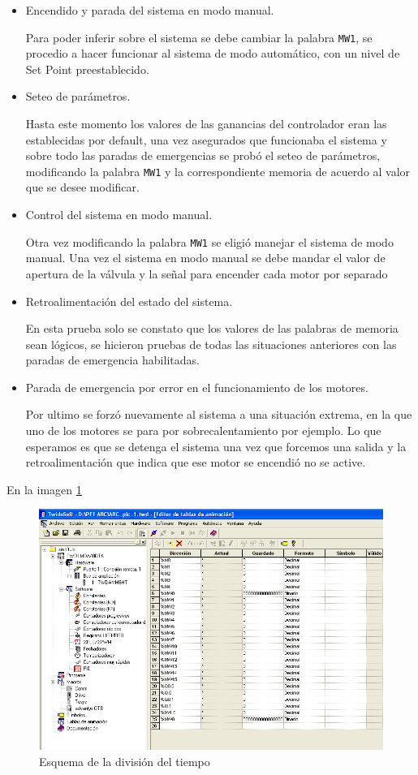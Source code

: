 \begin{itemize}
 \item Encendido y parada del sistema en modo manual.
 
 Para poder inferir sobre el sistema se debe cambiar la palabra \verb|MW1|, se procedio a
 hacer funcionar al sistema de modo automático, con un nivel de Set Point preestablecido.
 
 \item Seteo de parámetros.
 
 Hasta este momento los valores de las ganancias del controlador eran las establecidas por 
 default, una vez asegurados que funcionaba el sistema y sobre todo las paradas de emergencias
 se probó el seteo de parámetros, modificando la palabra \verb|MW1| y la correspondiente 
 memoria de acuerdo al valor que se desee modificar.
 
 \item Control del sistema en modo manual.
 
 Otra vez modificando la palabra \verb|MW1| se eligió manejar el sistema de modo manual.
 Una vez el sistema en modo manual se debe mandar el valor de apertura de la válvula y 
 la señal para encender cada motor por separado
 
 \item Retroalimentación del estado del sistema.
 
 En esta prueba solo se constato que los valores de las palabras de memoria sean lógicos,
 se hicieron pruebas de todas las situaciones anteriores con las paradas de emergencia 
 habilitadas.
 
 \item Parada de emergencia por error en el funcionamiento de los motores.
 
 Por ultimo se forzó nuevamente al sistema a una situación extrema, en la que uno
 de los motores se para por sobrecalentamiento por ejemplo. Lo que esperamos es que se
 detenga el sistema una vez que forcemos una salida y la retroalimentación que indica que
 ese motor se encendió no se active.
 
\end{itemize}

En la imagen \ref{img:twidosoftdebug}

\begin{figure}[ht!]
	\centering
	\includegraphics[scale=0.5]{Cap4-ProgramacionPLC/images/twidosoftdebug.PNG}
	\caption{Esquema de la división del tiempo}
	\label{img:twidosoftdebug}
\end{figure}
